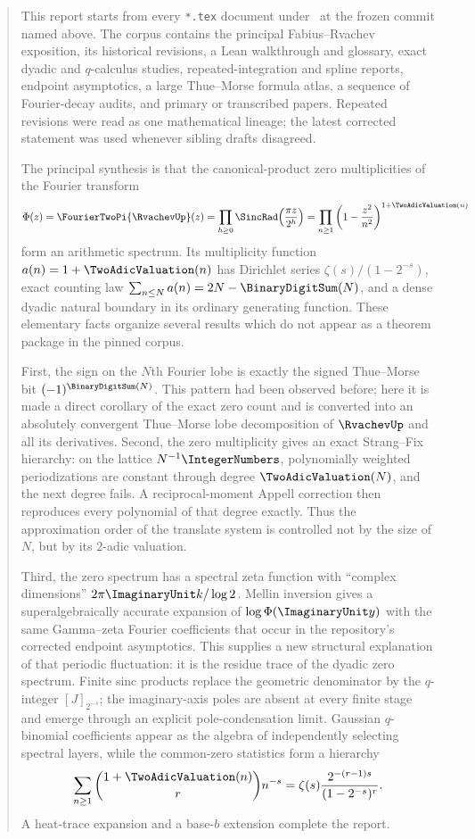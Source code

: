 \documentclass[11pt]{article}
\numberwithin{equation}{section}
\theoremstyle{definition}
\theoremstyle{remark}
\begin{document}
\begin{abstract}
This report starts from every \texttt{*.tex} document under \repo\ at the frozen
commit named above.  The corpus contains the principal Fabius--Rvachev exposition,
its historical revisions, a Lean walkthrough and glossary, exact dyadic and
$q$-calculus studies, repeated-integration and spline reports, endpoint asymptotics,
a large Thue--Morse formula atlas, a sequence of Fourier-decay audits, and primary
or transcribed papers.  Repeated revisions were read as one mathematical lineage;
the latest corrected statement was used whenever sibling drafts disagreed.

The principal synthesis is that the canonical-product zero multiplicities of the
Fourier transform
\[
 \Phi(z)=\FourierTwoPi{\RvachevUp}(z)=\prod_{h\ge0}\SincRad\!\left(\frac{\pi z}{2^h}\right)
       =\prod_{n\ge1}\left(1-\frac{z^2}{n^2}\right)^{1+\TwoAdicValuation(n)}
\]
form an arithmetic spectrum.  Its multiplicity function
$a(n)=1+\TwoAdicValuation(n)$ has Dirichlet series
$\zeta(s)/(1-2^{-s})$, exact counting law
$\sum_{n\le N}a(n)=2N-\BinaryDigitSum(N)$, and a dense dyadic natural boundary in its
ordinary generating function.  These elementary facts organize several results
which do not appear as a theorem package in the pinned corpus.

First, the sign on the $N$th Fourier lobe is exactly the signed Thue--Morse bit
$(-1)^{\BinaryDigitSum(N)}$.  This pattern had been observed before; here it is made a direct
corollary of the exact zero count and is converted into an absolutely convergent
Thue--Morse lobe decomposition of $\RvachevUp$ and all its derivatives.  Second, the
zero multiplicity gives an exact Strang--Fix hierarchy: on the lattice
$N^{-1}\IntegerNumbers$, polynomially weighted periodizations are constant through degree
$\TwoAdicValuation(N)$, and the next degree fails.  A reciprocal-moment Appell correction then
reproduces every polynomial of that degree exactly.  Thus the approximation order
of the translate system is controlled not by the size of $N$, but by its
$2$-adic valuation.

Third, the zero spectrum has a spectral zeta function with ``complex dimensions''
$2\pi\ImaginaryUnit k/\log2$.  Mellin inversion gives a superalgebraically accurate expansion
of $\log\Phi(\ImaginaryUnit y)$ with the same Gamma--zeta Fourier coefficients that occur in
the repository's corrected endpoint asymptotics.  This supplies a new structural
explanation of that periodic fluctuation: it is the residue trace of the dyadic
zero spectrum.  Finite sinc products replace the geometric denominator by the
$q$-integer $[J]_{2^{-s}}$; the imaginary-axis poles are absent at every finite
stage and emerge through an explicit pole-condensation limit.  Gaussian
$q$-binomial coefficients appear as the algebra of independently selecting
spectral layers, while the common-zero statistics form a hierarchy
\[
 \sum_{n\ge1}\binom{1+\TwoAdicValuation(n)}r n^{-s}
 =\zeta(s)\frac{2^{-(r-1)s}}{(1-2^{-s})^r}.
\]
A heat-trace expansion and a base-$b$ extension complete the report.


\end{abstract}
\end{document}
